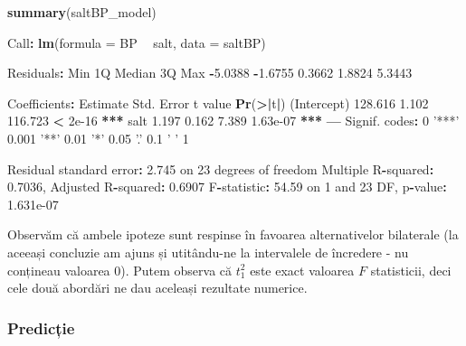 \documentclass[]{article}
\newenvironment{Shaded}{\begin{snugshade}}{\end{snugshade}}
\newcommand{\KeywordTok}[1]{\textcolor[rgb]{0.13,0.29,0.53}{\textbf{#1}}}
\newcommand{\DataTypeTok}[1]{\textcolor[rgb]{0.13,0.29,0.53}{#1}}
\newcommand{\DecValTok}[1]{\textcolor[rgb]{0.00,0.00,0.81}{#1}}
\newcommand{\FloatTok}[1]{\textcolor[rgb]{0.00,0.00,0.81}{#1}}
\newcommand{\StringTok}[1]{\textcolor[rgb]{0.31,0.60,0.02}{#1}}
\newcommand{\OperatorTok}[1]{\textcolor[rgb]{0.81,0.36,0.00}{\textbf{#1}}}
\newcommand{\ErrorTok}[1]{\textcolor[rgb]{0.64,0.00,0.00}{\textbf{#1}}}
\newcommand{\NormalTok}[1]{#1}
\begin{document}
\begin{Shaded}
\begin{Highlighting}[]
\KeywordTok{summary}\NormalTok{(saltBP_model)}

\NormalTok{Call}\OperatorTok{:}
\KeywordTok{lm}\NormalTok{(}\DataTypeTok{formula =}\NormalTok{ BP }\OperatorTok{~}\StringTok{ }\NormalTok{salt, }\DataTypeTok{data =}\NormalTok{ saltBP)}

\NormalTok{Residuals}\OperatorTok{:}
\StringTok{    }\NormalTok{Min      1Q  Median      3Q     Max }
\OperatorTok{-}\FloatTok{5.0388} \OperatorTok{-}\FloatTok{1.6755}  \FloatTok{0.3662}  \FloatTok{1.8824}  \FloatTok{5.3443} 

\NormalTok{Coefficients}\OperatorTok{:}
\StringTok{            }\NormalTok{Estimate Std. Error t value }\KeywordTok{Pr}\NormalTok{(}\OperatorTok{>}\ErrorTok{|}\NormalTok{t}\OperatorTok{|}\NormalTok{)    }
\NormalTok{(Intercept)  }\FloatTok{128.616}      \FloatTok{1.102} \FloatTok{116.723}  \OperatorTok{<}\StringTok{ }\FloatTok{2e-16} \OperatorTok{**}\ErrorTok{*}
\NormalTok{salt           }\FloatTok{1.197}      \FloatTok{0.162}   \FloatTok{7.389} \FloatTok{1.63e-07} \OperatorTok{**}\ErrorTok{*}
\OperatorTok{---}
\NormalTok{Signif. codes}\OperatorTok{:}\StringTok{  }\DecValTok{0} \StringTok{'***'} \FloatTok{0.001} \StringTok{'**'} \FloatTok{0.01} \StringTok{'*'} \FloatTok{0.05} \StringTok{'.'} \FloatTok{0.1} \StringTok{' '} \DecValTok{1}

\NormalTok{Residual standard error}\OperatorTok{:}\StringTok{ }\FloatTok{2.745}\NormalTok{ on }\DecValTok{23}\NormalTok{ degrees of freedom}
\NormalTok{Multiple R}\OperatorTok{-}\NormalTok{squared}\OperatorTok{:}\StringTok{  }\FloatTok{0.7036}\NormalTok{,    Adjusted R}\OperatorTok{-}\NormalTok{squared}\OperatorTok{:}\StringTok{  }\FloatTok{0.6907} 
\NormalTok{F}\OperatorTok{-}\NormalTok{statistic}\OperatorTok{:}\StringTok{ }\FloatTok{54.59}\NormalTok{ on }\DecValTok{1}\NormalTok{ and }\DecValTok{23}\NormalTok{ DF,  p}\OperatorTok{-}\NormalTok{value}\OperatorTok{:}\StringTok{ }\FloatTok{1.631e-07}
\end{Highlighting}
\end{Shaded}

Observăm că ambele ipoteze sunt respinse în favoarea alternativelor
bilaterale (la aceeași concluzie am ajuns și utitându-ne la intervalele
de încredere - nu conțineau valoarea \(0\)). Putem observa că \(t_1^2\)
este exact valoarea \(F\) statisticii, deci cele două abordări ne dau
aceleași rezultate numerice.

\subsubsection{Predicție}\label{predictie}
\end{document}
